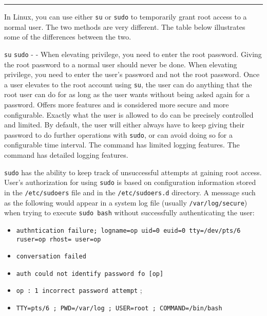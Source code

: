 \begin{center}\rule{3in}{0.4pt}\end{center}

In Linux, you can use either \texttt{su} or \texttt{sudo} to temporarily
grant root access to a normal user. The two methods are very different.
The table below illustrates some of the differences between the two.

\texttt{su} \textbar{} \texttt{sudo} - \textbar{} - When elevating
privilege, you need to enter the root password. Giving the root password
to a normal user should never be done. \textbar{} When elevating
privilege, you need to enter the user's password and not the root
password. Once a user elevates to the root account using \texttt{su},
the user can do anything that the root user can do for as long as the
user wants without being asked again for a password. \textbar{} Offers
more features and is considered more secure and more configurable.
Exactly what the user is allowed to do can be precisely controlled and
limited. By default, the user will either always have to keep giving
their password to do further operations with \texttt{sudo}, or can avoid
doing so for a configurable time interval. The command has limited
logging features. \textbar{} The command has detailed logging features.

\texttt{sudo} has the ability to keep track of unsuccessful attempts at
gaining root access. User's authorization for using \texttt{sudo} is
based on configuration information stored in the \texttt{/etc/sudoers}
file and in the \texttt{/etc/sudoers.d} directory. A messsage such as
the following would appear in a system log file (usually
\texttt{/var/log/secure}) when trying to execute \texttt{sudo bash}
without successfully authenticating the user:

\begin{itemize}
\itemsep1pt\parskip0pt
\item
  \texttt{authntication failure; logname=op uid=0 euid=0 tty=/dev/pts/6 ruser=op rhost= user=op}
\item
  \texttt{conversation failed}
\item
  \texttt{auth could not identify password fo {[}op{]}}
\item
  \texttt{op : 1 incorrect password attempt} ;
\item
  \texttt{TTY=pts/6 ; PWD=/var/log ; USER=root ; COMMAND=/bin/bash}
\end{itemize}

